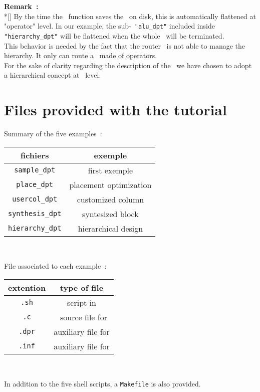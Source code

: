      \begin{minipage}[t]{\textwidth}
       {\bf Remark~:}\\*[\bigskipamount]
       \forceindent
         By the time the \DPDEFLOFIG\ function saves the \netlist\ on disk,
       this \netlist is automatically flattened at "operator" level. In
       our example, the sub-\datapath\ {\tt "alu\_dpt"} included
       inside {\tt "hierarchy\_dpt"} will be flattened when the whole
       \datapath\ will be terminated.\\
       \forceindent
         This behavior is needed by the fact that the router \dpr\ is not
       able to manage the hierarchy. It only can route a \netlist\ made of
       operators.\\
       \forceindent
         For the sake of clarity regarding the description of the \netlist\ 
       we have chosen to adopt a hierarchical concept at \fpgen\ level.
     \end{minipage}
   \newpage
   \appendix
   \section{Files provided with the tutorial}
     Summary of the five examples~:
   \begin{center}
     \begin{tabular}[t]{|c|c|}
       \hline
       fichiers   & exemple                           \\
       \hline
       \hline
       {\tt    sample\_dpt} & first exemple           \\
       {\tt     place\_dpt} & placement optimization  \\
       {\tt   usercol\_dpt} & customized column       \\
       {\tt synthesis\_dpt} & syntesized block        \\
       {\tt hierarchy\_dpt} & hierarchical design     \\
       \hline
     \end{tabular}\\
     \bigskip
   \end{center}
     File associated to each example~:
   \begin{center}
     \begin{tabular}[t]{|c|c|}
       \hline
       extention  & type of file                \\
       \hline
       \hline
       {\tt .sh}  & script in \bourneshell      \\
       {\tt .c}   & \C\ source file for \fpgen  \\
       {\tt .dpr} & auxiliary file for \dpr     \\
       {\tt .inf} & auxiliary file for \desb    \\
       \hline
     \end{tabular}\\
     \bigskip
   \end{center}
   In addition to the five shell scripts, a {\tt Makefile} is also provided.


 

